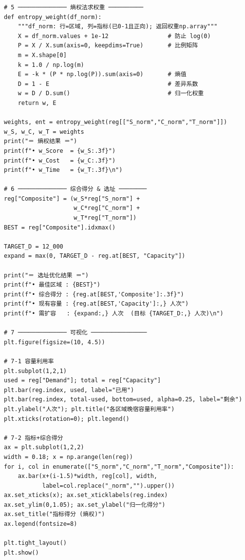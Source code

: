 \documentclass[12pt,a4paper]{article}
\begin{document}
\begin{lstlisting}
# 5 ────────────── 熵权法求权重 ──────────
def entropy_weight(df_norm):
    """df_norm: 行=区域, 列=指标(已0-1且正向); 返回权重np.array"""
    X = df_norm.values + 1e-12                 # 防止 log(0)
    P = X / X.sum(axis=0, keepdims=True)       # 比例矩阵
    m = X.shape[0]
    k = 1.0 / np.log(m)
    E = -k * (P * np.log(P)).sum(axis=0)       # 熵值
    D = 1 - E                                  # 差异系数
    w = D / D.sum()                            # 归一化权重
    return w, E

weights, ent = entropy_weight(reg[["S_norm","C_norm","T_norm"]])
w_S, w_C, w_T = weights
print("＝ 熵权结果 ＝")
print(f"• w_Score  = {w_S:.3f}")
print(f"• w_Cost   = {w_C:.3f}")
print(f"• w_Time   = {w_T:.3f}\n")

# 6 ────────────── 综合得分 & 选址 ────────
reg["Composite"] = (w_S*reg["S_norm"] +
                    w_C*reg["C_norm"] +
                    w_T*reg["T_norm"])
BEST = reg["Composite"].idxmax()

TARGET_D = 12_000
expand = max(0, TARGET_D - reg.at[BEST, "Capacity"])

print("＝ 选址优化结果 ＝")
print(f"• 最佳区域 : {BEST}")
print(f"• 综合得分 : {reg.at[BEST,'Composite']:.3f}")
print(f"• 现有容量 : {reg.at[BEST,'Capacity']:,} 人次")
print(f"• 需扩容   : {expand:,} 人次  (目标 {TARGET_D:,} 人次)\n")

# 7 ────────────── 可视化 ────────────────
plt.figure(figsize=(10, 4.5))

# 7‑1 容量利用率
plt.subplot(1,2,1)
used = reg["Demand"]; total = reg["Capacity"]
plt.bar(reg.index, used, label="已用")
plt.bar(reg.index, total-used, bottom=used, alpha=0.25, label="剩余")
plt.ylabel("人次"); plt.title("各区域晚宿容量利用率")
plt.xticks(rotation=0); plt.legend()

# 7‑2 指标+综合得分
ax = plt.subplot(1,2,2)
width = 0.18; x = np.arange(len(reg))
for i, col in enumerate(["S_norm","C_norm","T_norm","Composite"]):
    ax.bar(x+(i-1.5)*width, reg[col], width,
           label=col.replace("_norm","").upper())
ax.set_xticks(x); ax.set_xticklabels(reg.index)
ax.set_ylim(0,1.05); ax.set_ylabel("归一化得分")
ax.set_title("指标得分 (熵权)")
ax.legend(fontsize=8)

plt.tight_layout()
plt.show()
\end{lstlisting}

 
\end{document}

